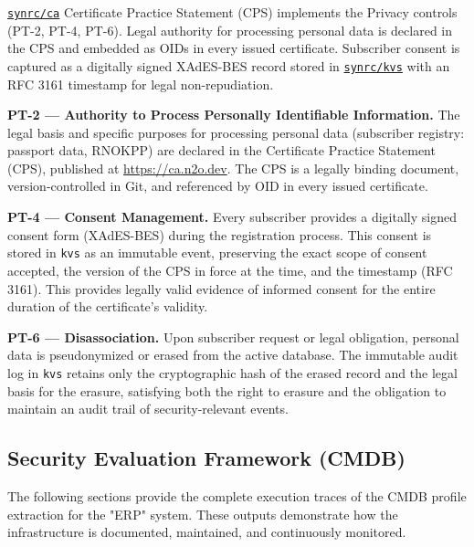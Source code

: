 \documentclass{article}
\begin{document}
\href{https://github.com/synrc/ca}{\texttt{synrc/ca}} Certificate Practice Statement (CPS) implements the Privacy controls (PT-2, PT-4, PT-6). Legal authority for processing personal data is declared in the CPS and embedded as OIDs in every issued certificate. Subscriber consent is captured as a digitally signed XAdES-BES record stored in \href{https://github.com/synrc/kvs}{\texttt{synrc/kvs}} with an RFC 3161 timestamp for legal non-repudiation.

\textbf{PT-2 --- Authority to Process Personally Identifiable Information.}
The legal basis and specific purposes for processing personal data (subscriber registry: passport data, RNOKPP) are declared in the Certificate Practice Statement (CPS), published at \url{https://ca.n2o.dev}. The CPS is a legally binding document, version-controlled in Git, and referenced by OID in every issued certificate.

\textbf{PT-4 --- Consent Management.}
Every subscriber provides a digitally signed consent form (XAdES-BES) during the registration process. This consent is stored in \texttt{kvs} as an immutable event, preserving the exact scope of consent accepted, the version of the CPS in force at the time, and the timestamp (RFC 3161). This provides legally valid evidence of informed consent for the entire duration of the certificate's validity.

\textbf{PT-6 --- Disassociation.}
Upon subscriber request or legal obligation, personal data is pseudonymized or erased from the active database. The immutable audit log in \texttt{kvs} retains only the cryptographic hash of the erased record and the legal basis for the erasure, satisfying both the right to erasure and the obligation to maintain an audit trail of security-relevant events.

\subsection{Security Evaluation Framework (CMDB)}
The following sections provide the complete execution traces of the CMDB profile extraction for the "ERP" system.
These outputs demonstrate how the infrastructure is documented, maintained, and continuously monitored.
\end{document}
